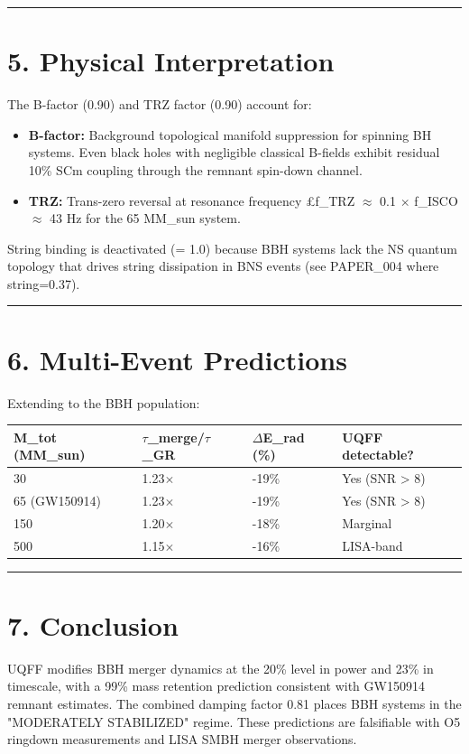 \documentclass[11pt]{article}
\begin{document}
\noindent\rule{\textwidth}{0.4pt}

\section*{5. Physical Interpretation}

The B-factor (0.90) and TRZ factor (0.90) account for:

\begin{itemize}
  \item \textbf{B-factor:} Background topological manifold suppression for spinning BH systems. Even black holes with negligible classical B-fields exhibit residual 10\% SCm coupling through the remnant spin-down channel.
  \item \textbf{TRZ:} Trans-zero reversal at resonance frequency £f\_TRZ $\approx$ 0.1 $\times$ f\_ISCO $\approx$ 43 Hz for the 65 MM\_sun system.
\end{itemize}

String binding is deactivated (= 1.0) because BBH systems lack the NS quantum topology that drives string dissipation in BNS events (see PAPER\_004 where string=0.37).

\noindent\rule{\textwidth}{0.4pt}

\section*{6. Multi-Event Predictions}

Extending to the BBH population:

\begin{center}
\begin{longtable}{llll}
\toprule
M\_tot (MM\_sun) & $\tau$\_merge/$\tau$\_GR & $\Delta$E\_rad (\%) & UQFF detectable? \tabularnewline
\midrule
\endhead
30 & 1.23$\times$ & -19\% & Yes (SNR > 8) \tabularnewline
65 (GW150914) & 1.23$\times$ & -19\% & Yes (SNR > 8) \tabularnewline
150 & 1.20$\times$ & -18\% & Marginal \tabularnewline
500 & 1.15$\times$ & -16\% & LISA-band \tabularnewline
\bottomrule
\end{longtable}
\end{center}

\noindent\rule{\textwidth}{0.4pt}

\section*{7. Conclusion}

UQFF modifies BBH merger dynamics at the 20\% level in power and 23\% in timescale, with a 99\% mass retention prediction consistent with GW150914 remnant estimates. The combined damping factor 0.81 places BBH systems in the "MODERATELY STABILIZED" regime. These predictions are falsifiable with O5 ringdown measurements and LISA SMBH merger observations.
\end{document}

